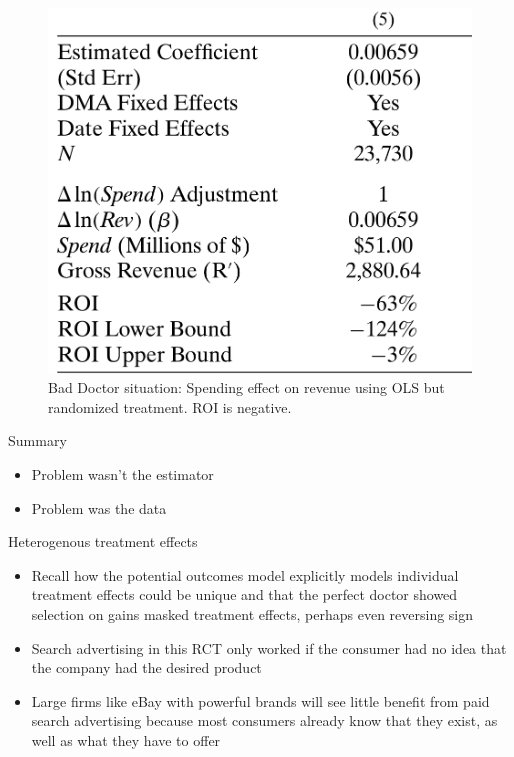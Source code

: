 \documentclass{beamer}
\begin{document}
\begin{frame}

\begin{figure}
\begin{center}
\includegraphics[scale=0.2]{./lecture_includes/tadelis_ols2.png}
\caption{Bad Doctor situation: Spending effect on revenue using OLS but randomized treatment. ROI is negative. }
\end{center}
\end{figure}

\end{frame}

\begin{frame}{Summary}

\begin{itemize}
\item Problem wasn't the estimator
\item Problem was the data
\end{itemize}

\end{frame}

\begin{frame}{Heterogenous treatment effects}

\begin{itemize}
\item Recall how the potential outcomes model explicitly models individual treatment effects could be unique and that the perfect doctor showed selection on gains masked treatment effects, perhaps even reversing sign
\item Search advertising in this RCT only worked if the consumer had no idea that the company had the desired product
\item Large firms like eBay with powerful brands will see little benefit from paid search advertising because most consumers already know that they exist, as well as what they have to offer
\end{itemize}

\end{frame}
\end{document}
